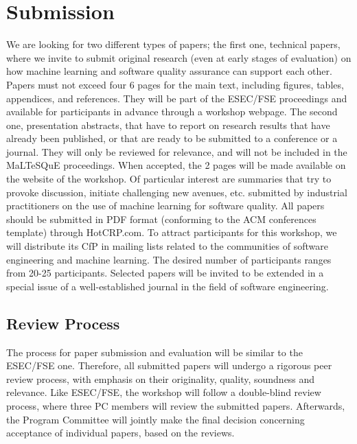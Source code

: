 \section{Submission}
\label{sec:submissions}
We are looking for two different types of papers; the first one, \ie technical papers, where we invite to submit original research (even at early stages of evaluation) on how machine learning and software quality assurance can support each other. Papers must not exceed four 6 pages for the main text, including figures, tables, appendices, and references. They will be part of the ESEC/FSE proceedings and available for participants in advance through a workshop webpage. The second one, \ie presentation abstracts, that have to report on research results that have already been published, or that are ready to be submitted to a conference or a journal. They will only be reviewed for relevance, and will not be included in the MaLTeSQuE proceedings. When accepted, the 2 pages will be made available on the website of the workshop. Of particular interest are summaries that try to provoke discussion, initiate challenging new avenues, etc. submitted by industrial practitioners on the use of machine learning for software quality. All papers should be submitted in PDF format (conforming to the ACM conferences template) through HotCRP.com.
To attract participants for this workshop, we will distribute its CfP in mailing lists related to the communities of software engineering and machine learning. The desired number of participants ranges from 20-25 participants.
Selected papers will be invited to be extended in a special issue of a well-established journal in the field of software engineering.
\subsection{Review Process}
The process for paper submission and evaluation will be similar to the ESEC/FSE one. Therefore, all submitted papers will undergo a rigorous peer review process, with emphasis on their originality, quality, soundness and relevance. Like ESEC/FSE, the workshop will follow a double-blind review process, where three PC members will review the submitted papers. Afterwards, the Program Committee will jointly make the final decision concerning acceptance of individual papers, based on the reviews.
